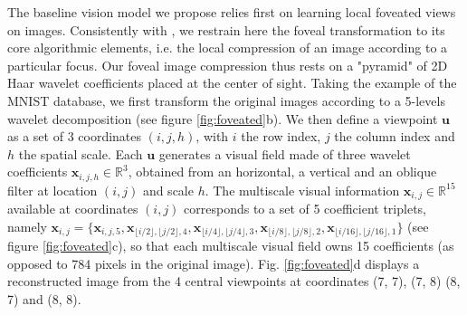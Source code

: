 \documentclass{article}
\begin{document}
The baseline vision model we propose relies first on learning local foveated views on images.
Consistently with \cite{kortum1996implementation,wang2003foveation}, we restrain here the foveal transformation to its core algorithmic elements, i.e. the local compression of an image according to a particular focus. Our foveal image compression thus rests on a "pyramid" of 2D Haar wavelet coefficients placed at the center of sight. Taking the example of the MNIST database, we first transform the original images according to a 5-levels wavelet decomposition (see figure \ref{fig:foveated}b). We then define a viewpoint $\boldsymbol{u}$ as a set of 3 coordinates $(i,j,h)$, with $i$ the row index, $j$ the column index and $h$ the spatial scale. Each $\boldsymbol{u}$ generates a visual field made of three wavelet coefficients $\boldsymbol{x}_{i,j,h} \in \mathbb{R}^3$, obtained from an horizontal, a vertical and an oblique filter at location $(i,j)$ and scale $h$.  The multiscale visual information $\boldsymbol{x}_{i,j} \in \mathbb{R}^{15}$ available at coordinates $(i,j)$ corresponds to a set of 5 coefficient triplets, namely $\boldsymbol{x}_{i,j}=\{\boldsymbol{x}_{i,j,5}, \boldsymbol{x}_{\lfloor i/2\rfloor,\lfloor j/2\rfloor,4}, \boldsymbol{x}_{\lfloor i/4\rfloor,\lfloor j/4\rfloor,3}, \boldsymbol{x}_{\lfloor i/8\rfloor,\lfloor j/8\rfloor, 2}, \boldsymbol{x}_{\lfloor i/16\rfloor,\lfloor j/16\rfloor, 1}\}$ (see figure \ref{fig:foveated}c), so that each multiscale visual field owns 15 coefficients (as opposed to 784 pixels in the original image).
Fig. \ref{fig:foveated}d displays a reconstructed image from the 4 central viewpoints at coordinates (7, 7), (7, 8) (8, 7) and (8, 8).
\end{document}
